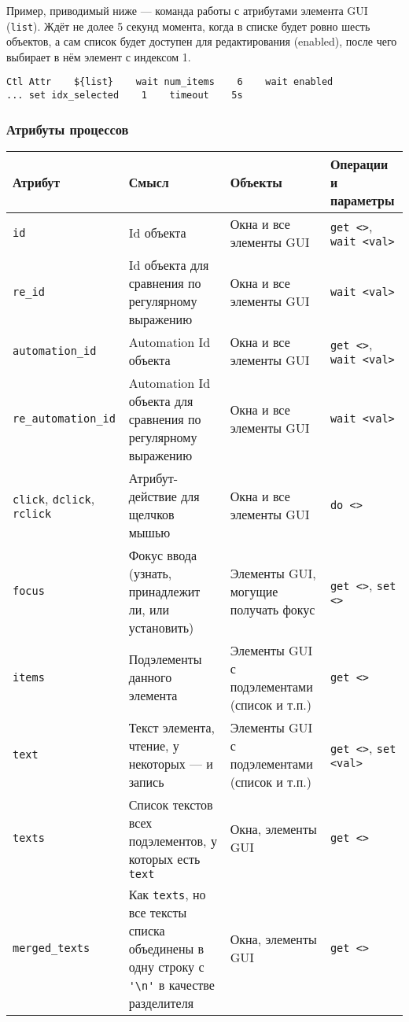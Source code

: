 \documentclass[11pt]{book} %
\begin{document}
Пример, приводимый ниже --- команда работы с атрибутами элемента GUI (\verb|list|). Ждёт не долее 5 секунд момента, когда в списке будет ровно шесть объектов, а сам список будет доступен для редактирования (enabled), после чего выбирает в нём элемент с индексом 1.
\begin{verbatim}
Ctl Attr    ${list}    wait num_items    6    wait enabled 
... set idx_selected    1    timeout    5s
\end{verbatim}


\subsubsection{Атрибуты процессов}
\begin{center}
	\begin{tabular}{|p{90pt}|p{120pt}|p{100pt}|p{60pt}|}\hline
		\textbf{Атрибут} & \textbf{Смысл} & \textbf{Объекты} & \textbf{Операции и параметры} \\ \hline
		\verb|id| & Id объекта & Окна и все элементы GUI & \verb|get <>|, \verb|wait <val>| \\ \hline
		\verb|re_id| & Id объекта для сравнения по регулярному выражению & Окна и все элементы GUI & \verb|wait <val>| \\ \hline
		\verb|automation_id| & Automation Id объекта & Окна и все элементы GUI & \verb|get <>|, \verb|wait <val>| \\ \hline
		\verb|re_automation_id| & Automation Id объекта для сравнения по регулярному выражению & Окна и все элементы GUI & \verb|wait <val>| \\ \hline
		\verb|click|, \verb|dclick|, \verb|rclick| & Атрибут-действие для щелчков мышью & Окна и все элементы GUI & \verb|do <>| \\ \hline
		\verb|focus| & Фокус ввода (узнать, принадлежит ли, или установить) & Элементы GUI, могущие получать фокус & \verb|get <>|, \verb|set <>|  \\ \hline		
		\verb|items| & Подэлементы данного элемента & Элементы GUI с подэлементами (список и т.п.) & \verb|get <>| \\ \hline				
		\verb|text| & Текст элемента, чтение, у некоторых --- и запись & Элементы GUI с подэлементами (список и т.п.) & \verb|get <>|, \verb|set <val>| \\ \hline				
		\verb|texts| & Список текстов всех подэлементов, у которых есть \verb|text| & Окна, элементы GUI & \verb|get <>| \\ \hline
		\verb|merged_texts| & Как \verb|texts|, но все тексты списка объединены в одну строку с \verb"'\n'" в качестве разделителя & Окна, элементы GUI & \verb|get <>| \\ \hline

\end{tabular}
\end{center}
\end{document}
